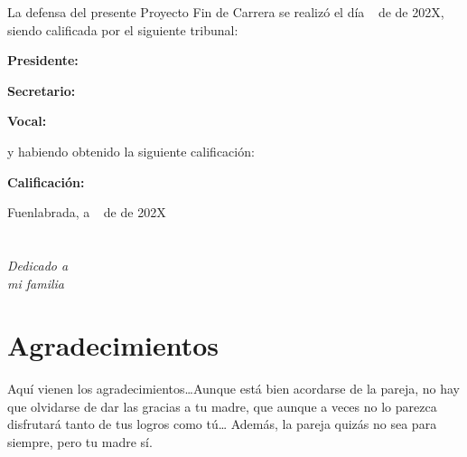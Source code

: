 \documentclass[a4paper, 12pt]{book}
\begin{document}
\vspace{1cm}
La defensa del presente Proyecto Fin de Carrera se realizó el día \qquad$\;\,$ de \qquad\qquad\qquad\qquad \newline de 202X, siendo calificada por el siguiente tribunal:


\vspace{0.5cm}
\textbf{Presidente:}

\vspace{1.2cm}
\textbf{Secretario:}

\vspace{1.2cm}
\textbf{Vocal:}


\vspace{1.2cm}
y habiendo obtenido la siguiente calificación:

\vspace{1cm}
\textbf{Calificación:}


\vspace{1cm}
\begin{flushright}
Fuenlabrada, a \qquad$\;\,$ de \qquad\qquad\qquad\qquad de 202X
\end{flushright}


\chapter*{}
\begin{flushright}
\textit{Dedicado a \\
mi familia}
\end{flushright}


\chapter*{Agradecimientos}

Aquí vienen los agradecimientos\ldots Aunque está bien acordarse de la pareja, no hay que olvidarse de dar las gracias a tu madre, que aunque a veces no lo parezca disfrutará tanto de tus logros como tú\ldots 
Además, la pareja quizás no sea para siempre, pero tu madre sí.
\end{document}

